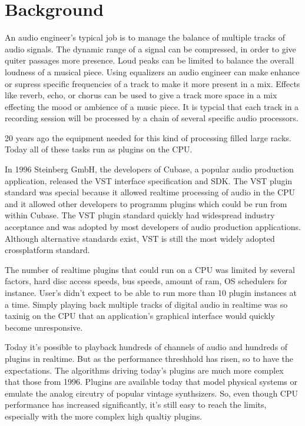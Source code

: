 \section{Background}

An audio engineer's typical job is to manage the balance of multiple tracks of audio signals. The dynamic range of a signal can be compressed, in order to give quiter passages more presence. Loud peaks can be limited to balance the overall loudness of a musical piece. Using equalizers an audio engineer can make enhance or supress specific frequencies of a track to make it more present in a mix. Effects like reverb, echo, or chorus can be used to give a track more space in a mix effecting the mood or ambience of a music piece. It is typcial that each track in a recording session will be processed by a chain of several specific audio processors.

20 years ago the equipment needed for this kind of processing filled large racks. Today all of these tasks run as
plugins on the CPU.

In 1996 Steinberg GmbH, the developers of Cubase, a popular audio production application, released the VST interface specification and SDK.\cite{VST-wikipedia} The VST plugin standard was special because it allowed realtime processing of audio in the CPU and it allowed other developers to programm plugins which could be run from within Cubase. The VST plugin standard quickly had widespread industry acceptance and was adopted by most developers of audio production applications. Although alternative standards exist, VST is still the most widely adopted crossplatform standard.

The number of realtime plugins that could run on a CPU was limited by several factors, hard disc access speeds, bus speeds, amount of ram, OS schedulers for instance\cite{latency98}. User's didn't expect to be able to run more than 10 plugin instances at a time. Simply playing back multiple tracks of digital audio in realtime was so taxinig on the CPU that an application's graphical interface would quickly become unresponsive.

Today it's possible to playback hundreds of channels of audio and hundreds of plugins in realtime. But as the performance threshhold has risen, so to have the expectations. The algorithms driving today's plugins are much more complex that those from 1996. Plugins are available today that model physical systems or emulate the analog circutry of popular vintage synthsizers. So, even though CPU performance has increased significantly, it's still easy to reach the limits, especially with the more complex high qualtiy plugins.

